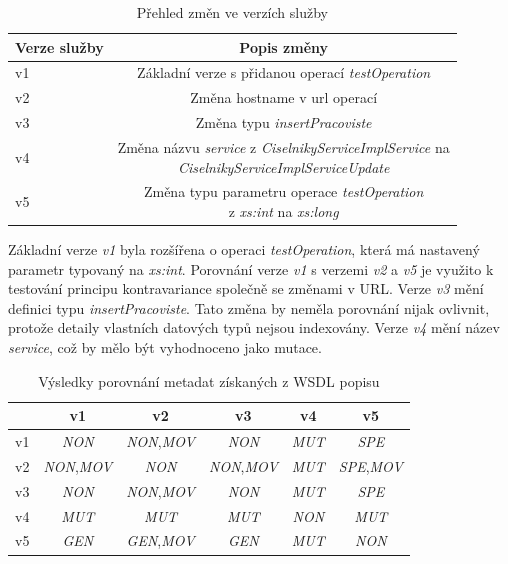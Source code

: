 \documentclass[czech,DP]{thesiskiv}
\begin{document}
\begin{table}[h]
	\centering
	\begin{tabular}{|l|c|}
		\hline
		Verze služby & Popis změny \\
		\hline
		\hline
		v1 & Základní verze s přidanou operací \textit{testOperation} \\
		\hline
		v2 & Změna hostname v url operací \\
		\hline
		v3 & Změna typu \textit{insertPracoviste} \\
		\hline
		v4 & \makecell{Změna názvu \textit{service} z \textit{CiselnikyServiceImplService} na \\ \textit{CiselnikyServiceImplServiceUpdate}}  \\
		\hline
		v5 & \makecell{Změna typu parametru operace \textit{testOperation} \\
		z \textit{xs:int} na \textit{xs:long}} \\ \hline
	\end{tabular}
	\caption{Přehled změn ve verzích služby}
	\label{tab:wsdl-diffs}
\end{table}

Základní verze \textit{v1} byla rozšířena o operaci \textit{testOperation}, která má nastavený parametr typovaný na \textit{xs:int}. Porovnání verze \textit{v1} s verzemi \textit{v2} a \textit{v5} je využito k testování principu kontravariance společně se změnami v URL. Verze \textit{v3} mění definici typu \textit{insertPracoviste}. Tato změna by neměla porovnání nijak ovlivnit, protože detaily vlastních datových typů nejsou indexovány. Verze \textit{v4} mění název \textit{service}, což by mělo být vyhodnoceno jako mutace.

\begin{table}[h]
	\centering
	\begin{tabular}{|l||c|c|c|c|c|}
		\hline
		& v1 & v2 & v3 & v4 & v5 \\
		\hline
		\hline
		v1 & \textit{NON} & \textit{NON},\textit{MOV} & \textit{NON} & \textit{MUT} & \textit{SPE} \\
		\hline
		v2 & \textit{NON},\textit{MOV} & \textit{NON} & \textit{NON},\textit{MOV} & \textit{MUT} & \textit{SPE},\textit{MOV} \\
		\hline
		v3 & \textit{NON} & \textit{NON},\textit{MOV} & \textit{NON} & \textit{MUT} & \textit{SPE} \\
		\hline
		v4 & \textit{MUT} & \textit{MUT} & \textit{MUT} & \textit{NON} & \textit{MUT} \\
		\hline
		v5 & \textit{GEN} & \textit{GEN},\textit{MOV} & \textit{GEN} & \textit{MUT} & \textit{NON} \\
		\hline
	\end{tabular}
	\caption{Výsledky porovnání metadat získaných z WSDL popisu}
	\label{tab:stag-wsdl-cmp-res}
\end{table}
\end{document}
